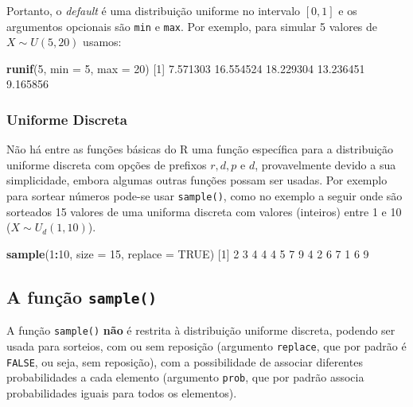 \documentclass[10pt,a4paper]{book}
\newenvironment{Shaded}{\begin{snugshade}}{\end{snugshade}}
\newcommand{\KeywordTok}[1]{\textcolor[rgb]{0.13,0.29,0.53}{\textbf{#1}}}
\newcommand{\DataTypeTok}[1]{\textcolor[rgb]{0.13,0.29,0.53}{#1}}
\newcommand{\DecValTok}[1]{\textcolor[rgb]{0.00,0.00,0.81}{#1}}
\newcommand{\FloatTok}[1]{\textcolor[rgb]{0.00,0.00,0.81}{#1}}
\newcommand{\OtherTok}[1]{\textcolor[rgb]{0.56,0.35,0.01}{#1}}
\newcommand{\OperatorTok}[1]{\textcolor[rgb]{0.81,0.36,0.00}{\textbf{#1}}}
\newcommand{\NormalTok}[1]{#1}
\begin{document}
Portanto, o \emph{default} é uma distribuição uniforme no intervalo
\([0,1]\) e os argumentos opcionais são \texttt{min} e \texttt{max}. Por
exemplo, para simular 5 valores de \(X \sim U(5, 20)\) usamos:

\begin{Shaded}
\begin{Highlighting}[]
\KeywordTok{runif}\NormalTok{(}\DecValTok{5}\NormalTok{, }\DataTypeTok{min =} \DecValTok{5}\NormalTok{, }\DataTypeTok{max =} \DecValTok{20}\NormalTok{)}
\NormalTok{[}\DecValTok{1}\NormalTok{]  }\FloatTok{7.571303} \FloatTok{16.554524} \FloatTok{18.229304} \FloatTok{13.236451}  \FloatTok{9.165856}
\end{Highlighting}
\end{Shaded}

\subsubsection{Uniforme Discreta}\label{uniforme-discreta}

Não há entre as funções básicas do R uma função específica para a
distribuição uniforme discreta com opções de prefixos \(r,d,p\) e \(d\),
provavelmente devido a sua simplicidade, embora algumas outras funções
possam ser usadas. Por exemplo para sortear números pode-se usar
\texttt{sample()}, como no exemplo a seguir onde são sorteados 15
valores de uma uniforma discreta com valores (inteiros) entre 1 e 10
(\(X \sim U_d(1,10)\)).

\begin{Shaded}
\begin{Highlighting}[]
\KeywordTok{sample}\NormalTok{(}\DecValTok{1}\OperatorTok{:}\DecValTok{10}\NormalTok{, }\DataTypeTok{size =} \DecValTok{15}\NormalTok{, }\DataTypeTok{replace =} \OtherTok{TRUE}\NormalTok{)}
\NormalTok{ [}\DecValTok{1}\NormalTok{] }\DecValTok{2} \DecValTok{3} \DecValTok{4} \DecValTok{4} \DecValTok{4} \DecValTok{5} \DecValTok{7} \DecValTok{9} \DecValTok{4} \DecValTok{2} \DecValTok{6} \DecValTok{7} \DecValTok{1} \DecValTok{6} \DecValTok{9}
\end{Highlighting}
\end{Shaded}

\subsection{\texorpdfstring{A função
\texttt{sample()}}{A função sample()}}\label{a-funuxe7uxe3o-sample}

A função \texttt{sample()} \textbf{não} é restrita à distribuição
uniforme discreta, podendo ser usada para sorteios, com ou sem reposição
(argumento \texttt{replace}, que por padrão é \texttt{FALSE}, ou seja,
sem reposição), com a possibilidade de associar diferentes
probabilidades a cada elemento (argumento \texttt{prob}, que por padrão
associa probabilidades iguais para todos os elementos).
\end{document}
